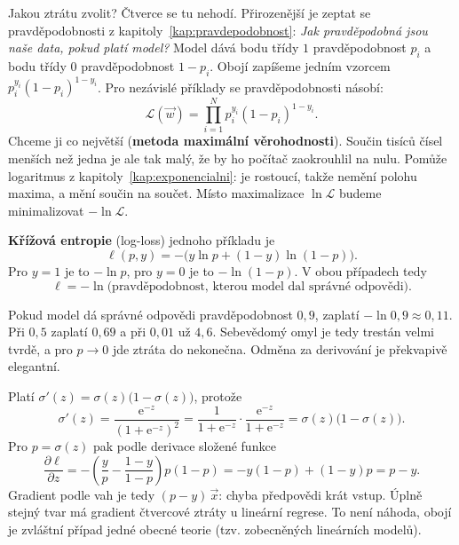 Jakou ztrátu zvolit? Čtverce se tu nehodí. Přirozenější je zeptat se pravděpodobnosti z kapitoly~\ref{kap:pravdepodobnost}: \textit{Jak pravděpodobná jsou naše data, pokud platí model?} Model dává bodu třídy $1$ pravděpodobnost $p_i$ a bodu třídy $0$ pravděpodobnost $1 - p_i$. Obojí zapíšeme jedním vzorcem $p_i^{y_i}{(1 - p_i)}^{1 - y_i}$. Pro nezávislé příklady se pravděpodobnosti násobí:
\begin{equation*}
  \mathcal{L}(\vec{w}) = \prod_{i=1}^{N}p_i^{y_i}{(1 - p_i)}^{1 - y_i}.
\end{equation*}
Chceme ji co největší (\textbf{metoda maximální věrohodnosti}). Součin tisíců čísel menších než jedna je ale tak malý, že by ho počítač zaokrouhlil na nulu. Pomůže logaritmus z kapitoly~\ref{kap:exponencialni}: je rostoucí, takže nemění polohu maxima, a mění součin na součet. Místo maximalizace $\ln\mathcal{L}$ budeme minimalizovat $-\ln\mathcal{L}$.

\begin{definitionbox}
  \textbf{Křížová entropie} (log-loss) jednoho příkladu je
  \begin{equation*}
    \ell(p, y) = -\big(y\ln p + (1 - y)\ln(1 - p)\big).
  \end{equation*}
  Pro $y = 1$ je to $-\ln p$, pro $y = 0$ je to $-\ln(1 - p)$. V obou případech tedy
  \begin{equation*}
    \ell = -\ln\big(\text{pravděpodobnost, kterou model dal správné odpovědi}\big).
  \end{equation*}
\end{definitionbox}

Pokud model dá správné odpovědi pravděpodobnost $0{,}9$, zaplatí $-\ln 0{,}9\approx 0{,}11$. Při $0{,}5$ zaplatí $0{,}69$ a při $0{,}01$ už $4{,}6$. Sebevědomý omyl je tedy trestán velmi tvrdě, a pro $p\to 0$ jde ztráta do nekonečna. Odměna za derivování je překvapivě elegantní.

\begin{example}
  Platí $\sigma'(z) = \sigma(z)\big(1 - \sigma(z)\big)$, protože
  \begin{equation*}
    \sigma'(z) = \frac{\mathrm{e}^{-z}}{{(1 + \mathrm{e}^{-z})}^2} = \frac{1}{1 + \mathrm{e}^{-z}}\cdot\frac{\mathrm{e}^{-z}}{1 + \mathrm{e}^{-z}} = \sigma(z)\big(1 - \sigma(z)\big).
  \end{equation*}
  Pro $p = \sigma(z)$ pak podle derivace složené funkce
  \begin{equation*}
    \frac{\partial\ell}{\partial z} = -\left(\frac{y}{p} - \frac{1 - y}{1 - p}\right)p(1 - p) = -y(1 - p) + (1 - y)p = p - y.
  \end{equation*}
  Gradient podle vah je tedy $(p - y)\,\vec{x}$: chyba předpovědi krát vstup. Úplně stejný tvar má gradient čtvercové ztráty u lineární regrese. To není náhoda, obojí je zvláštní případ jedné obecné teorie (tzv. zobecněných lineárních modelů).
\end{example}

